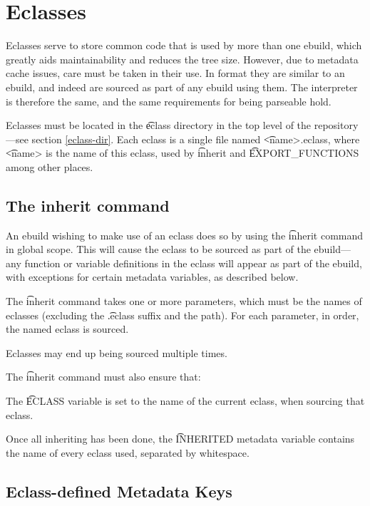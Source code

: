 \chapter{Eclasses}
\label{eclasses}

Eclasses serve to store common code that is used by more than one ebuild, which greatly aids
maintainability and reduces the tree size. However, due to metadata cache issues, care must be taken
in their use. In format they are similar to an ebuild, and indeed are sourced as part of any ebuild
using them. The interpreter is therefore the same, and the same requirements for being parseable
hold.

Eclasses must be located in the \t{eclass} directory in the top level of the repository---see
section \ref{eclass-dir}. Each eclass is a single file named \t{<name>.eclass}, where \t{<name>} is
the name of this eclass, used by \t{inherit} and \t{EXPORT\_FUNCTIONS} among other places.

\section{The inherit command}

An ebuild wishing to make use of an eclass does so by using the \t{inherit} command in global scope.
This will cause the eclass to be sourced as part of the ebuild---any function or variable
definitions in the eclass will appear as part of the ebuild, with exceptions for certain metadata
variables, as described below.

The \t{inherit} command takes one or more parameters, which must be the names of eclasses (excluding
the \t{.eclass} suffix and the path). For each parameter, in order, the named eclass is sourced.

Eclasses may end up being sourced multiple times.

The \t{inherit} command must also ensure that:

\begin{bulletlist}
\item The \t{ECLASS} variable is set to the name of the current eclass, when sourcing that eclass.
\item Once all inheriting has been done, the \t{INHERITED} metadata variable contains the name of
    every eclass used, separated  by whitespace.
\end{bulletlist}

\section{Eclass-defined Metadata Keys}

